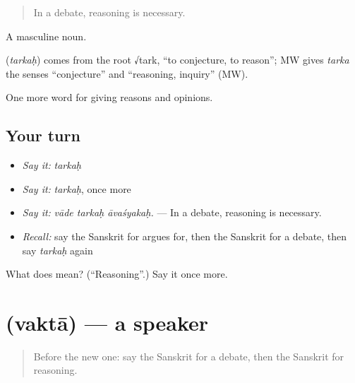 \begin{quote}
In a debate, reasoning is necessary.
\end{quote}

A masculine noun.

\begin{cousinweb}
\textbf{} (\emph{tarkaḥ}) comes from the root √tark, \textquotedblleft{}to conjecture, to reason\textquotedblright{}; MW gives \emph{tarka} the senses \textquotedblleft{}conjecture\textquotedblright{} and \textquotedblleft{}reasoning, inquiry\textquotedblright{} (MW).
\end{cousinweb}

\begin{grammarlens}[title={What you've built}]
One more word for giving reasons and opinions.
\end{grammarlens}

\subsection*{Your turn}
\begin{itemize}
\raggedright
  \item \emph{Say it:} \emph{tarkaḥ}
  \item \emph{Say it:} \emph{tarkaḥ}, once more
  \item \emph{Say it:} \emph{vāde tarkaḥ āvaśyakaḥ.} — In a debate, reasoning is necessary.
  \item \emph{Recall:} say the Sanskrit for argues for, then the Sanskrit for a debate, then say \emph{tarkaḥ} again
\end{itemize}

\begin{tcolorbox}[breakable,colback=teal!4,colframe=teal!35!black,title={Before you move on}]
What does  mean? (\textquotedblleft{}Reasoning\textquotedblright{}.) Say it once more.
\end{tcolorbox}
\section[\texorpdfstring{\sk{वक्ता} (vaktā)}{वक्ता (vaktā)}]{ (vaktā) — a speaker}

\label{lesson:SA-C343-vakta}



\begin{quote}
Before the new one: say the Sanskrit for a debate, then the Sanskrit for reasoning.
\end{quote}

